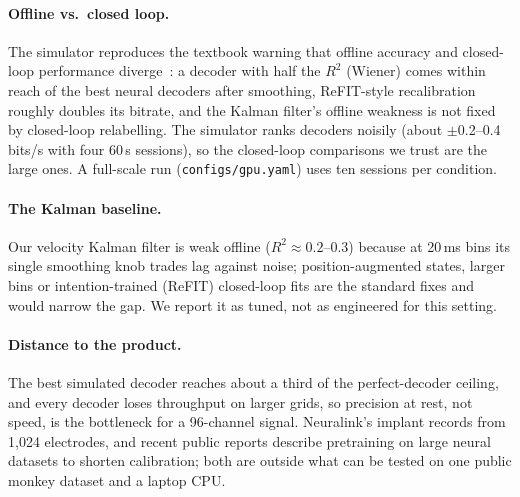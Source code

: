 \paragraph{Offline vs.\ closed loop.} The simulator reproduces the textbook warning that
offline accuracy and closed-loop performance diverge~\cite{cunningham2011closed,willett2019principled}:
a decoder with half the $R^2$ (Wiener) comes within reach of the best neural decoders after
smoothing, ReFIT-style recalibration roughly doubles its bitrate, and the Kalman filter's offline
weakness is not fixed by closed-loop relabelling. The simulator ranks decoders noisily (about
$\pm$0.2--0.4 bits/s with four 60\,s sessions), so the closed-loop comparisons we trust are the
large ones. A full-scale run (\texttt{configs/gpu.yaml}) uses ten sessions per condition.

\paragraph{The Kalman baseline.} Our velocity Kalman filter is weak offline ($R^2\approx0.2$--0.3)
because at 20\,ms bins its single smoothing knob trades lag against noise; position-augmented
states, larger bins or intention-trained (ReFIT) closed-loop fits are the standard fixes and
would narrow the gap. We report it as tuned, not as engineered for this setting.

\paragraph{Distance to the product.} The best simulated decoder reaches about a third of the
perfect-decoder ceiling, and every decoder loses throughput on larger grids, so precision at
rest, not speed, is the bottleneck for a 96-channel signal. Neuralink's implant records from 1{,}024
electrodes, and recent public reports describe pretraining on large neural datasets to shorten
calibration; both are outside what can be tested on one public monkey dataset and a laptop CPU.
